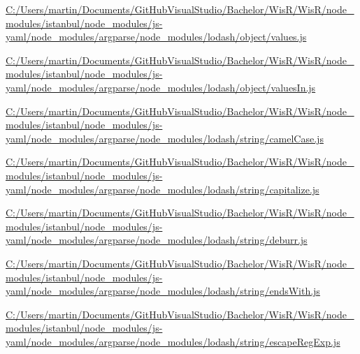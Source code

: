 \begin{DoxyCompactItemize}
\item 
\hyperlink{_c_1_2_users_2martin_2_documents_2_git_hub_visual_studio_2_bachelor_2_wis_r_2_wis_r_2node_moduled141d89d3d57ba8a79ede188f0c0e75a}{C\+:/\+Users/martin/\+Documents/\+Git\+Hub\+Visual\+Studio/\+Bachelor/\+Wis\+R/\+Wis\+R/node\+\_\+modules/istanbul/node\+\_\+modules/js-\/yaml/node\+\_\+modules/argparse/node\+\_\+modules/lodash/object/values.\+js}
\item 
\hyperlink{_c_1_2_users_2martin_2_documents_2_git_hub_visual_studio_2_bachelor_2_wis_r_2_wis_r_2node_modulebfe93c04eb9e202165e1d0eb97c9ecf5}{C\+:/\+Users/martin/\+Documents/\+Git\+Hub\+Visual\+Studio/\+Bachelor/\+Wis\+R/\+Wis\+R/node\+\_\+modules/istanbul/node\+\_\+modules/js-\/yaml/node\+\_\+modules/argparse/node\+\_\+modules/lodash/object/values\+In.\+js}
\item 
\hyperlink{_c_1_2_users_2martin_2_documents_2_git_hub_visual_studio_2_bachelor_2_wis_r_2_wis_r_2node_moduled3d43384178532de2e575ee925720b4c}{C\+:/\+Users/martin/\+Documents/\+Git\+Hub\+Visual\+Studio/\+Bachelor/\+Wis\+R/\+Wis\+R/node\+\_\+modules/istanbul/node\+\_\+modules/js-\/yaml/node\+\_\+modules/argparse/node\+\_\+modules/lodash/string/camel\+Case.\+js}
\item 
\hyperlink{_c_1_2_users_2martin_2_documents_2_git_hub_visual_studio_2_bachelor_2_wis_r_2_wis_r_2node_modulefcd1af4fa467d05b6ab9c6a316b4a9a5}{C\+:/\+Users/martin/\+Documents/\+Git\+Hub\+Visual\+Studio/\+Bachelor/\+Wis\+R/\+Wis\+R/node\+\_\+modules/istanbul/node\+\_\+modules/js-\/yaml/node\+\_\+modules/argparse/node\+\_\+modules/lodash/string/capitalize.\+js}
\item 
\hyperlink{_c_1_2_users_2martin_2_documents_2_git_hub_visual_studio_2_bachelor_2_wis_r_2_wis_r_2node_modulef361eb8fc703a26622d106b85f9d3046}{C\+:/\+Users/martin/\+Documents/\+Git\+Hub\+Visual\+Studio/\+Bachelor/\+Wis\+R/\+Wis\+R/node\+\_\+modules/istanbul/node\+\_\+modules/js-\/yaml/node\+\_\+modules/argparse/node\+\_\+modules/lodash/string/deburr.\+js}
\item 
\hyperlink{_c_1_2_users_2martin_2_documents_2_git_hub_visual_studio_2_bachelor_2_wis_r_2_wis_r_2node_module0d86c3e426571faf0a0c1565f7a1c066}{C\+:/\+Users/martin/\+Documents/\+Git\+Hub\+Visual\+Studio/\+Bachelor/\+Wis\+R/\+Wis\+R/node\+\_\+modules/istanbul/node\+\_\+modules/js-\/yaml/node\+\_\+modules/argparse/node\+\_\+modules/lodash/string/ends\+With.\+js}
\item 
\hyperlink{_c_1_2_users_2martin_2_documents_2_git_hub_visual_studio_2_bachelor_2_wis_r_2_wis_r_2node_modulea59b83e56114138812022b9467a5eb00}{C\+:/\+Users/martin/\+Documents/\+Git\+Hub\+Visual\+Studio/\+Bachelor/\+Wis\+R/\+Wis\+R/node\+\_\+modules/istanbul/node\+\_\+modules/js-\/yaml/node\+\_\+modules/argparse/node\+\_\+modules/lodash/string/escape\+Reg\+Exp.\+js}

\end{DoxyCompactItemize}
